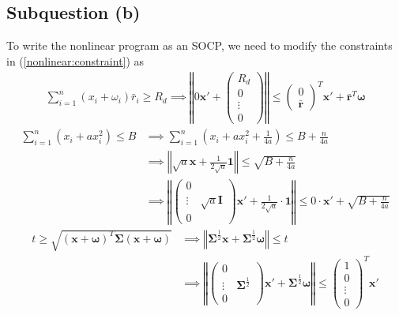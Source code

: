 \documentclass[12pt]{ftec2101}
\newcommand{\matr}[1]{\mathbf{#1}}
\newcommand{\vect}[1]{\mathbf{#1}}
\begin{document}
\subsection{Subquestion (b)}
To write the nonlinear program as an SOCP, we need to modify the constraints in (\ref{nonlinear:constraint}) as
\begin{align}
    \sum_{i=1}^{n} (x_i + \omega_i)\bar{r}_i \geq R_d \implies \left \Vert 0 \vect{x'} + 
    \begin{pmatrix}
        R_d\\
        0\\
        \vdots\\
        0
    \end{pmatrix} \right \Vert \leq
    \begin{pmatrix}
        0\\
        \bar{\vect{r}}
    \end{pmatrix}^T \vect{x'} + \bar{\vect{r}}^T \boldsymbol{\omega}
\end{align}
\begin{align}
    \sum_{i=1}^{n} (x_i + a x_i^2) \leq B &\implies \sum_{i=1}^{n} \left(x_i + a x_i^2+\frac{1}{4a}\right) \leq B+\frac{n}{4a} \\
    &\implies \left \Vert \sqrt{a} \vect{x} + \frac{1}{2\sqrt{a}} \vect{1}\right \Vert \leq \sqrt{B+\frac{n}{4a}} \\
    &\implies \left \Vert 
    \begin{pmatrix}
        0 & \\
        \vdots & \sqrt{a} \matr{I} \\
        0 & 
    \end{pmatrix}\vect{x'} + \frac{1}{2\sqrt{a}} \cdot \vect{1} \right \Vert \leq 0 \cdot \vect{x'} + \sqrt{B+\frac{n}{4a}}
\end{align}
\begin{align}
    t \geq \sqrt{(\vect{x}+\boldsymbol{\omega})^T \boldsymbol{\Sigma} (\vect{x}+\boldsymbol{\omega})} &\implies \left \Vert \boldsymbol{\Sigma}^{\frac{1}{2}} \vect{x} + \boldsymbol{\Sigma}^{\frac{1}{2}}\boldsymbol{\omega}\right \Vert \leq t \\
    &\implies \left \Vert
    \begin{pmatrix}
        0 & \\
        \vdots & \boldsymbol{\Sigma}^{\frac{1}{2}}\\
        0 & 
    \end{pmatrix} \vect{x'} + \boldsymbol{\Sigma}^{\frac{1}{2}} \boldsymbol{\omega} \right \Vert \leq
    \begin{pmatrix}
        1 \\
        0 \\
        \vdots \\
        0
    \end{pmatrix}^T \vect{x'}
\end{align}
\end{document}
